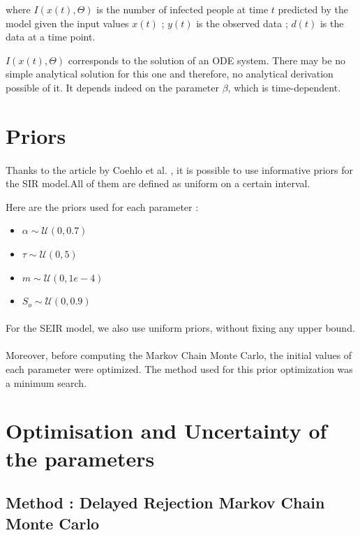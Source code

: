 \documentclass[11pt, a4paper]{article}
\begin{document}
where $I(x(t), \Theta)$ is the number of infected people at time $t$ predicted by the model given the input values $x(t)$ ; $y(t)$ is the observed data ; $d(t)$ is the data at a time point.

$I(x(t), \Theta)$ corresponds to the solution of an ODE system. There may be no simple analytical solution for this one and therefore, no analytical derivation possible of it. It depends indeed on the parameter $\beta$, which is time-dependent.

\section{Priors}
\paragraph{}
Thanks to the article by Coehlo et al. \cite{coelho2011bayesian}, it is possible to use informative priors for the SIR model.All of them are defined as uniform on a certain interval.

Here are the priors used for each parameter : 
\begin{itemize}
\item $\alpha \sim \mathcal{U}(0, 0.7)$
\item $\tau \sim \mathcal{U}(0, 5)$
\item $m \sim  \mathcal{U}(0, 1e-4)$
\item $S_o \sim \mathcal{U}(0, 0.9)$
\end{itemize}

\paragraph{}
For the SEIR model, we also use uniform priors, without fixing any upper bound.

\paragraph{}
Moreover, before computing the Markov Chain Monte Carlo, the initial values of each parameter were optimized. The method used for this prior optimization was a minimum search.

\section{Optimisation and Uncertainty of the parameters}

\subsection{Method : Delayed Rejection Markov Chain Monte Carlo}
\end{document}
